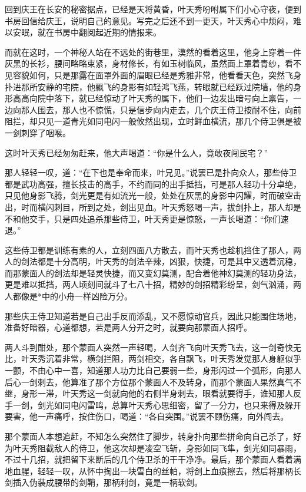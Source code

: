 回到庆王在长安的秘密据点，已经是天将黄昏，叶天秀吩咐属下们小心守夜，便到书房回信给庆王，说明自己的意见。写完之后还不到一更天，叶天秀心中烦闷，难以安眠，就在书房中翻阅起近期的情报来。

而就在这时，一个神秘人站在不远处的街巷里，漠然的看着这里，他身上穿着一件灰黑的长衫，腰间略略束紧，身材修长，有如玉树临风，虽然面上罩着青纱，看不见容貌如何，只是那露在面罩外面的眉眼已经是秀雅非常，他看看天色，突然飞身扑进那所安静的宅院，他飘飞的身影有如轻鸿飞燕，转眼就已经跃过院墙，他的身形高高向院中落下，就已经惊动了叶天秀的属下，他们一边发出暗号向上禀告，一边向那人围去，那人也不惊慌，只是信步向内走去，几个庆王侍卫按耐不住，向前阻拦，却只见一道青光如同电闪一般攸然出现，立时鲜血横流，那几个侍卫俱是被一剑刺穿了咽喉。

这时叶天秀已经匆匆赶来，他大声喝道：“你是什么人，竟敢夜闯民宅？”

那人轻轻一叹，道：“在下也是奉命而来，叶兄见。”说罢已是扑向众人，那些侍卫都是武功高强，擅长技击的高手，不约而同的出手抵挡，可是那人轻功十分卓绝，只见他身影飞腾，剑光更是有如流光一般，处处在灰黑的身影中闪耀，时而破空击出，时而横闪刺目，所到之处，剑出见血。叶天秀怒喝一声，拔剑扑上，那人却是不和他交手，只是四处追杀那些侍卫，叶天秀更是惊怒，一声长喝道：“你们速退。”

这些侍卫都是训练有素的人，立刻四面八方散去，而叶天秀也趁机挡住了那人，两人的剑法都是十分高明，叶天秀的剑法辛辣，凶狠，快捷，可是其中又透着沉稳，而那蒙面人的剑法却是轻灵快捷，而又变幻莫测，配合着他神幻莫测的轻功身法，更是难以抵挡，两人顷刻间就斗了七八十招，精妙的剑招精彩纷呈，剑气汹涌，两人都像是*中的小舟一样凶险万分。

那些庆王侍卫知道若是自己出手反而添乱，又不愿惊动官兵，因此只能围住场地，准备好暗器，心道都想，若是两人分开之时，就要向那蒙面人招呼。

两人斗到酣处，那个蒙面人突然一声轻喝，人剑齐飞向叶天秀飞去，这一剑奇快无比，叶天秀沉着非常，横剑拦阻，两剑相交，各自飘飞，叶天秀发觉那人身躯似乎一颤，不由心中一喜，知道那人功力比自己要弱一些，身形闪过一个弧形，向那人后心一剑刺去，他算准了那个方位那个蒙面人不及转身，而那个蒙面人果然真气不继，身形一滞，叶天秀这一剑就向他的右侧半身刺去，眼看就要得手，谁知那人反手一剑，剑光如同电闪雷鸣，总算叶天秀心思细密，留了一分力，也只来得及躲开要害，他一声痛呼，按住伤口，喝道：“各自突围。”说罢不顾伤痛，向外闯去。

那个蒙面人本想追赶，不知怎么突然住了脚步，转身扑向那些拼命向自己杀了，好为叶天秀阻截敌人的侍卫，他这次却是凌空飞斩，身影如同飞隼，剑光如同暴雨，不过十几招，就把留下来断后的几个侍卫杀的干干净净。最后，那个蒙面人看着满地血腥，轻轻一叹，从怀中掏出一块雪白的丝帕，将剑上血痕擦去，然后将那柄长剑插入伪装成腰带的剑鞘，那柄利剑，竟是一柄软剑。

